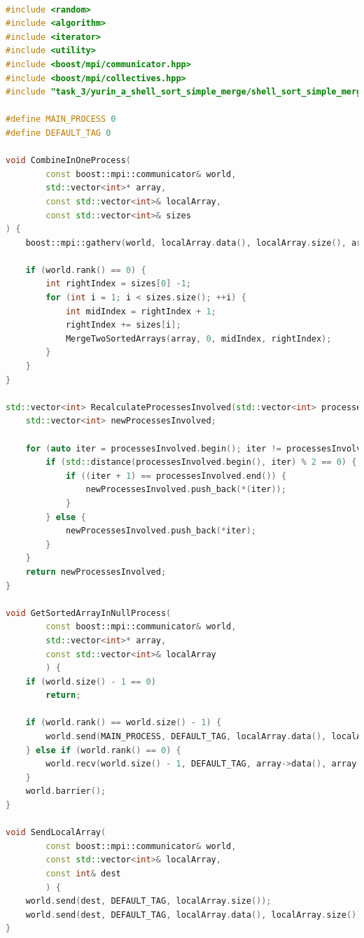 \documentclass{report}
\begin{document}
\begin{lstlisting}[language=C++,caption=cpp файл]

#include <random>
#include <algorithm>
#include <iterator>
#include <utility>
#include <boost/mpi/communicator.hpp>
#include <boost/mpi/collectives.hpp>
#include "task_3/yurin_a_shell_sort_simple_merge/shell_sort_simple_merge.h"

#define MAIN_PROCESS 0
#define DEFAULT_TAG 0

void CombineInOneProcess(
        const boost::mpi::communicator& world,
        std::vector<int>* array,
        const std::vector<int>& localArray,
        const std::vector<int>& sizes
) {
    boost::mpi::gatherv(world, localArray.data(), localArray.size(), array->data(), sizes, 0);

    if (world.rank() == 0) {
        int rightIndex = sizes[0] -1;
        for (int i = 1; i < sizes.size(); ++i) {
            int midIndex = rightIndex + 1;
            rightIndex += sizes[i];
            MergeTwoSortedArrays(array, 0, midIndex, rightIndex);
        }
    }
}

std::vector<int> RecalculateProcessesInvolved(std::vector<int> processesInvolved) {
    std::vector<int> newProcessesInvolved;

    for (auto iter = processesInvolved.begin(); iter != processesInvolved.end(); iter++) {
        if (std::distance(processesInvolved.begin(), iter) % 2 == 0) {
            if ((iter + 1) == processesInvolved.end()) {
                newProcessesInvolved.push_back(*(iter));
            }
        } else {
            newProcessesInvolved.push_back(*iter);
        }
    }
    return newProcessesInvolved;
}

void GetSortedArrayInNullProcess(
        const boost::mpi::communicator& world,
        std::vector<int>* array,
        const std::vector<int>& localArray
        ) {
    if (world.size() - 1 == 0)
        return;

    if (world.rank() == world.size() - 1) {
        world.send(MAIN_PROCESS, DEFAULT_TAG, localArray.data(), localArray.size());
    } else if (world.rank() == 0) {
        world.recv(world.size() - 1, DEFAULT_TAG, array->data(), array->size());
    }
    world.barrier();
}

void SendLocalArray(
        const boost::mpi::communicator& world,
        const std::vector<int>& localArray,
        const int& dest
        ) {
    world.send(dest, DEFAULT_TAG, localArray.size());
    world.send(dest, DEFAULT_TAG, localArray.data(), localArray.size());
}


\end{lstlisting}
\end{document}
